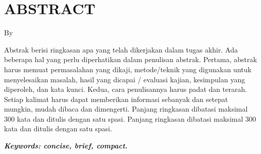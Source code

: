 \clearpage
\chapter*{ABSTRACT}

\begin{center}
  \center
  \large \bfseries \MakeUppercase{\thetitle}

  \normalfont\normalsize
  By

  \theauthor
\end{center}

\vspace{1cm}

\begin{singlespace}
  Abstrak berisi ringkasan apa yang telah dikerjakan dalam tugas akhir. Ada beberapa hal yang perlu diperhatikan dalam penulisan abstrak. Pertama, abstrak harus memuat permasalahan yang dikaji, metode/teknik yang digunakan untuk menyelesaikan masalah, hasil yang dicapai / evaluasi kajian, kesimpulan yang diperoleh, dan kata kunci.  Kedua, cara penulisannya harus padat dan terarah. Setiap kalimat harus dapat memberikan informasi sebanyak dan setepat mungkin, mudah dibaca dan dimengerti. Panjang ringkasan dibatasi maksimal 300 kata dan ditulis dengan satu spasi. Panjang ringkasan dibatasi maksimal 300 kata dan ditulis dengan satu spasi.
\end{singlespace}

\textbf{\textit{Keywords: concise, brief, compact.}}
\clearpage